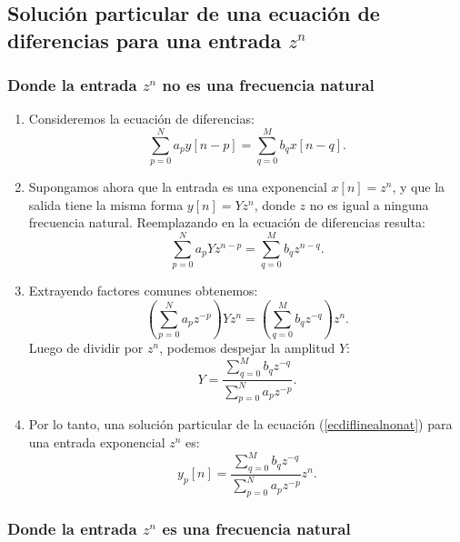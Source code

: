 \documentclass[11pt,a4paper,openany]{book}
\begin{document}
\subsection{Soluci\'{o}n particular de una ecuaci\'{o}n de diferencias para una entrada $z^{n}$}

\subsubsection{Donde la entrada $z^{n}$ no es una frecuencia natural}

\begin{enumerate}
	\item Consideremos la ecuaci\'{o}n de diferencias:
	\begin{equation}
		\sum_{p=0}^{N}a_{p} y[n-p] = \sum_{q=0}^{M}b_{q} x[n-q]. \label{ecdiflinealnonat}
	\end{equation}
	
	\item Supongamos ahora que la entrada es una exponencial $x[n] = z^{n}$, y que la salida tiene la misma forma $y[n] = Y z^{n}$, donde $z$ no es igual a ninguna frecuencia natural. Reemplazando en la ecuaci\'{o}n de diferencias resulta:
	\begin{equation}
		\sum_{p=0}^{N}a_{p} Y z^{n-p} = \sum_{q=0}^{M}b_{q} z^{n-q}.
	\end{equation}
	
	\item Extrayendo factores comunes obtenemos:
	\begin{equation}
		\left( \sum_{p=0}^{N}a_{p} z^{-p} \right) Y z^{n} = \left(\sum_{q=0}^{M}b_{q} z^{-q} \right) z^{n}. \label{ecdifpart}
	\end{equation}
	Luego de dividir por $z^n$, podemos despejar la amplitud $Y$:
	\begin{equation}
		Y = \frac{\sum_{q=0}^{M}b_{q} z^{-q}}{\sum_{p=0}^{N}a_{p} z^{-p}}.
	\end{equation}
	
	\item Por lo tanto, una soluci\'{o}n particular de la ecuaci\'{o}n (\ref{ecdiflinealnonat}) para una entrada exponencial $z^{n}$ es:
	\begin{equation}
		y_{p}[n] = \frac{\sum_{q=0}^{M}b_{q} z^{-q}}{\sum_{p=0}^{N}a_{p} z^{-p}} z^{n}. \label{eqhzorig}
	\end{equation}
\end{enumerate}

\subsubsection{Donde la entrada $z^{n}$ es una frecuencia natural}
\end{document}
